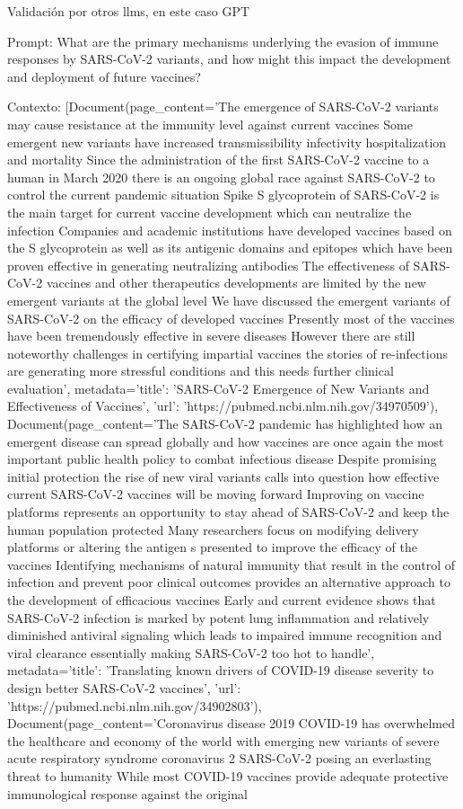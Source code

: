 Validación por otros llms, en este caso GPT

Prompt: What are the primary mechanisms underlying the evasion of immune responses by SARS-CoV-2 variants, and how might this impact the development and deployment of future vaccines?

Contexto: [Document(page\_content='The emergence of SARS-CoV-2 variants may cause resistance at the immunity level against current vaccines Some emergent new variants have increased transmissibility infectivity hospitalization and mortality Since the administration of the first SARS-CoV-2 vaccine to a human in March 2020 there is an ongoing global race against SARS-CoV-2 to control the current pandemic situation Spike S glycoprotein of SARS-CoV-2 is the main target for current vaccine development which can neutralize the infection Companies and academic institutions have developed vaccines based on the S glycoprotein as well as its antigenic domains and epitopes which have been proven effective in generating neutralizing antibodies The effectiveness of SARS-CoV-2 vaccines and other therapeutics developments are limited by the new emergent variants at the global level We have discussed the emergent variants of SARS-CoV-2 on the efficacy of developed vaccines Presently most of the vaccines have been tremendously effective in severe diseases However there are still noteworthy challenges in certifying impartial vaccines the stories of re-infections are generating more stressful conditions and this needs further clinical evaluation', metadata={'title': 'SARS-CoV-2 Emergence of New Variants and Effectiveness of Vaccines', 'url': 'https://pubmed.ncbi.nlm.nih.gov/34970509'}), Document(page\_content='The SARS-CoV-2 pandemic has highlighted how an emergent disease can spread globally and how vaccines are once again the most important public health policy to combat infectious disease Despite promising initial protection the rise of new viral variants calls into question how effective current SARS-CoV-2 vaccines will be moving forward Improving on vaccine platforms represents an opportunity to stay ahead of SARS-CoV-2 and keep the human population protected Many researchers focus on modifying delivery platforms or altering the antigen s presented to improve the efficacy of the vaccines Identifying mechanisms of natural immunity that result in the control of infection and prevent poor clinical outcomes provides an alternative approach to the development of efficacious vaccines Early and current evidence shows that SARS-CoV-2 infection is marked by potent lung inflammation and relatively diminished antiviral signaling which leads to impaired immune recognition and viral clearance essentially making SARS-CoV-2 too hot to handle', metadata={'title': 'Translating known drivers of COVID-19 disease severity to design better SARS-CoV-2 vaccines', 'url': 'https://pubmed.ncbi.nlm.nih.gov/34902803'}), Document(page\_content='Coronavirus disease 2019 COVID-19 has overwhelmed the healthcare and economy of the world with emerging new variants of severe acute respiratory syndrome coronavirus 2 SARS-CoV-2 posing an everlasting threat to humanity While most COVID-19 vaccines provide adequate protective immunological response against the original 